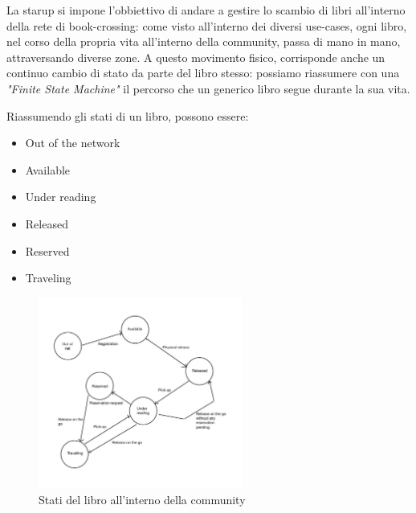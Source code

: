 La starup si impone l'obbiettivo di andare a gestire lo scambio di libri all'interno della rete di book-crossing: come visto all'interno dei diversi use-cases, ogni libro, nel corso della propria vita all'interno della community, passa di mano in mano, attraversando diverse zone.
A questo movimento fisico, corrisponde anche un continuo cambio di stato da parte del libro stesso: possiamo riassumere con una \textit{"Finite State Machine"} il percorso che un generico libro segue durante la sua vita.

Riassumendo gli stati di un libro, possono essere:
\begin{itemize}
	\item Out of the network
	\item Available
	\item Under reading
	\item Released
	\item Reserved
	\item Traveling
\end{itemize}

\begin{figure}[h!]
	\centering
	\includegraphics[width=0.6\textwidth]{Immagini/BookState.jpg}
	\caption{Stati del libro all'interno della community}
	\label{fig:BookState}
\end{figure}